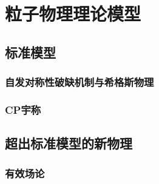 \chapter{粒子物理理论模型}
\label{chap:theory}

\section{标准模型}
\subsection{自发对称性破缺机制与希格斯物理}
\subsection{CP宇称}

\section{超出标准模型的新物理}
\subsection{有效场论}

